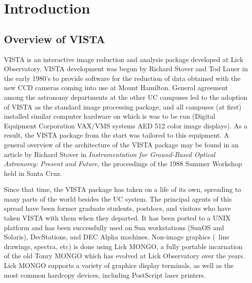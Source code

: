 %
%
%
%
%
%

%



%

\pagestyle{manual}
\chapter{Introduction}

\section{Overview of VISTA}

VISTA is an interactive image reduction and analysis package developed at Lick
Observatory.  VISTA development was begun by Richard Stover and Tod Lauer in
the early 1980's to provide software for the reduction of data obtained with
the new CCD cameras coming into use at Mount Hamilton.  General agreement among
the astronomy departments at the other UC campuses led to the adoption of
VISTA as the standard image processing package, and all campuses (at first)
installed similar computer hardware on which is was to be run (Digital
Equipment Corporation VAX/VMS systems AED 512 color image displays).  As a
result, the VISTA package from the start was tailored to this equipment.  A
general overview of the architecture of the VISTA package may be found in an
article by Richard Stover in {\it Instrumentation for Ground-Based Optical
Astronomy: Present and Future}, the proceedings of the 1988 Summer Workshop
held in Santa Cruz. 

Since that time, the VISTA package has taken on a life of its own, spreading
to many parts of the world besides the UC system.  The principal agents of
this spread have been former graduate students, postdocs, and visitors who
have taken VISTA with them when they departed. It has been ported to a UNIX
platform and has been successfully used on Sun workstations (SunOS and
Solaris), DecStations, and DEC Alpha machines.
Non-image graphics (\eg\ line drawings, spectra, etc) is done using Lick
MONGO, a fully portable incarnation of the old Tonry MONGO which has evolved
at Lick Observatory over the years.  Lick MONGO supports a variety of graphics
display terminals, as well as the most common hardcopy devices, including
PostScript laser printers. 

